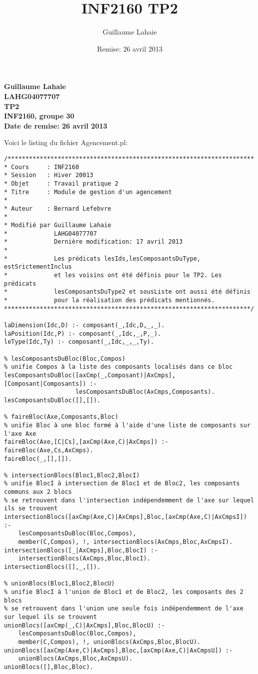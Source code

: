\documentclass[letterpaper,11pt]{letter}
\title{INF2160 TP2}
\author{Guillaume Lahaie}
\date{Remise: 26 avril 2013}
\begin{document}
\begin{center}{\Large{\bf Guillaume Lahaie\\
LAHG04077707\\
TP2\\
INF2160, groupe 30\\
Date de remise: 26 avril 2013}}\\
\end{center}

Voici le listing du fichier Agencement.pl:

\begin{verbatim}
/*********************************************************************
* Cours		: INF2160
* Session	: Hiver 20013
* Objet		: Travail pratique 2
* Titre		: Module de gestion d'un agencement
* 
* Auteur	: Bernard Lefebvre
*
* Modifié par Guillaume Lahaie
*             LAHG04077707
*             Dernière modification: 17 avril 2013
*
*             Les prédicats lesIds,lesComposantsDuType, estSrictementInclus
*             et les voisins ont été définis pour le TP2. Les prédicats
*             lesComposantsDuType2 et sousListe ont aussi été définis
*             pour la réalisation des prédicats mentionnés.
*********************************************************************/

laDimension(Idc,D) :- composant(_,Idc,D,_,_).
laPosition(Idc,P) :- composant(_,Idc,_,P,_).
leType(Idc,Ty) :- composant(_,Idc,_,_,Ty).

% lesComposantsDuBloc(Bloc,Compos)
% unifie Compos à la liste des composants localisés dans ce bloc
lesComposantsDuBloc([axCmp(_,Composant)|AxCmps],[Composant|Composants]) :-
                    lesComposantsDuBloc(AxCmps,Composants).
lesComposantsDuBloc([],[]).

% faireBloc(Axe,Composants,Bloc)
% unifie Bloc à une bloc formé à l'aide d'une liste de composants sur l'axe Axe
faireBloc(Axe,[C|Cs],[axCmp(Axe,C)|AxCmps]) :- faireBloc(Axe,Cs,AxCmps).
faireBloc(_,[],[]).

% intersectionBlocs(Bloc1,Bloc2,BlocI)
% unifie BlocI à intersection de Bloc1 et de Bloc2, les composants communs aux 2 blocs
% se retrouvent dans l'intersection indépendemment de l'axe sur lequel ils se trouvent
intersectionBlocs([axCmp(Axe,C)|AxCmps],Bloc,[axCmp(Axe,C)|AxCmpsI]) :-
	lesComposantsDuBloc(Bloc,Compos),
	member(C,Compos), !, intersectionBlocs(AxCmps,Bloc,AxCmpsI).
intersectionBlocs([_|AxCmps],Bloc,BlocI) :-
	intersectionBlocs(AxCmps,Bloc,BlocI).
intersectionBlocs([],_,[]).

% unionBlocs(Bloc1,Bloc2,BlocU)
% unifie BlocI à l'union de Bloc1 et de Bloc2, les composants des 2 blocs
% se retrouvent dans l'union une seule fois indépendemment de l'axe sur lequel ils se trouvent
unionBlocs([axCmp(_,C)|AxCmps],Bloc,BlocU) :-
	lesComposantsDuBloc(Bloc,Compos),
	member(C,Compos), !, unionBlocs(AxCmps,Bloc,BlocU).
unionBlocs([axCmp(Axe,C)|AxCmps],Bloc,[axCmp(Axe,C)|AxCmpsU]) :-
	unionBlocs(AxCmps,Bloc,AxCmpsU).
unionBlocs([],Bloc,Bloc).


\end{verbatim}
\end{document}

